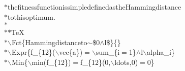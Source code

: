 \begin{flushleft}
{\hspace*{1\indentation}$\ast$\hspace*{16\indentation}the\hspace*{1\indentation}fitness\hspace*{1\indentation}function\hspace*{1\indentation}is\hspace*{1\indentation}simple\hspace*{1\indentation}defined\hspace*{1\indentation}as\hspace*{1\indentation}the\hspace*{1\indentation}Hamming\hspace*{1\indentation}distance\mbox{}\\
\hspace*{1\indentation}$\ast$\hspace*{16\indentation}to\hspace*{1\indentation}this\hspace*{1\indentation}optimum.\mbox{}\\
\hspace*{1\indentation}$\ast$\mbox{}\\
\hspace*{1\indentation}$\ast$$\ast$TeX\mbox{}\\
\hspace*{1\indentation}$\ast$\hspace*{8\indentation}$\backslash$Fct\{Hamming\hspace*{1\indentation}distance\hspace*{1\indentation}to$\sim$\$0$\wedge$l\$\}\{\}\mbox{}\\
\hspace*{1\indentation}$\ast$\hspace*{8\indentation}$\backslash$Expr\{f\_\{12\}($\backslash$vec\{a\})\hspace*{1\indentation}$=$\hspace*{1\indentation}$\backslash$sum\_\{i$=$1\}$\wedge$l\hspace*{1\indentation}$\backslash$alpha\_i\}\mbox{}\\
\hspace*{1\indentation}$\ast$\hspace*{8\indentation}$\backslash$Min\{$\backslash$min(f\_\{12\})\hspace*{1\indentation}$=$\hspace*{1\indentation}f\_\{12\}(0,$\backslash$ldots,0)\hspace*{1\indentation}$=$\hspace*{1\indentation}0\}\mbox{}\\
$$}
\end{flushleft}
